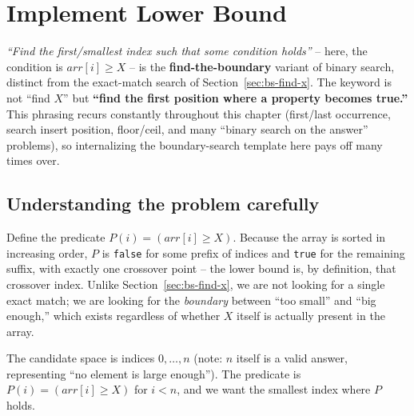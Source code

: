 \section{Implement Lower Bound}
\label{sec:bs-lower-bound}


\begin{patternbox}
\emph{``Find the first/smallest index such that some condition holds''} --
here, the condition is $\textit{arr}[i] \ge X$ -- is the
\textbf{find-the-boundary} variant of binary search, distinct from the
exact-match search of Section~\ref{sec:bs-find-x}. The keyword is not
``find $X$'' but \textbf{``find the first position where a property
becomes true.''} This phrasing recurs constantly throughout this chapter
(first/last occurrence, search insert position, floor/ceil, and many
``binary search on the answer'' problems), so internalizing the
boundary-search template here pays off many times over.
\end{patternbox}

\subsection*{Understanding the problem carefully}

Define the predicate $P(i) = (\textit{arr}[i] \ge X)$. Because the array is
sorted in increasing order, $P$ is \texttt{false} for some prefix of
indices and \texttt{true} for the remaining suffix, with exactly one
crossover point -- the lower bound is, by definition, that crossover index.
Unlike Section~\ref{sec:bs-find-x}, we are not looking for a single exact
match; we are looking for the \emph{boundary} between ``too small'' and
``big enough,'' which exists regardless of whether $X$ itself is actually
present in the array.

\begin{ideabox}
The candidate space is indices $0, \dots, n$ (note: $n$ itself is a valid
answer, representing ``no element is large enough''). The predicate is
$P(i) = (\textit{arr}[i] \ge X)$ for $i < n$, and we want the smallest index
where $P$ holds.
\end{ideabox}

